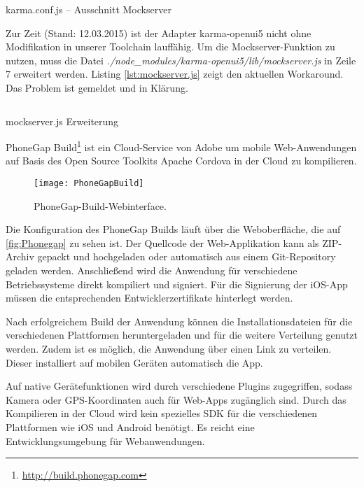 \begin{listing}[H]
	\inputminted[tabsize=2]{js}{src/karma.mockserver.conf.js}
	\caption{karma.conf.js -- Ausschnitt Mockserver}
	\label{lst:karma.mockserver.conf.js}
\end{listing}

Zur Zeit (Stand: 12.03.2015) ist der Adapter karma-openui5 nicht ohne Modifikation in unserer Toolchain lauffähig. Um die Mockserver-Funktion zu nutzen, muss die Datei \textit{./node\_modules/karma-openui5/lib/mockserver.js} in Zeile 7 erweitert werden. Listing \ref{lst:mockserver.js} zeigt den aktuellen Workaround. Das Problem ist gemeldet und in Klärung.

\begin{listing}[H]
	\inputminted[tabsize=2]{js}{src/mockserver.js}
	\caption{mockserver.js Erweiterung}
	\label{lst:mockserver.js}
\end{listing}

PhoneGap Build\footnote{\url{http://build.phonegap.com}} ist ein Cloud-Service von Adobe um mobile Web-An\-wen\-dun\-gen auf Basis des Open Source Toolkits Apache Cordova in der Cloud zu kompilieren. 

\begin{figure}[h]
\centering
\texttt{[image: PhoneGapBuild]}
\caption[PhoneGap-Build-Webinterface]{PhoneGap-Build-Webinterface.}
\label{fig:Phonegap}
\end{figure}

Die Konfiguration des PhoneGap Builds läuft über die Weboberfläche, die auf \autoref{fig:Phonegap} zu sehen ist. Der Quellcode der Web-Applikation kann als ZIP-Archiv gepackt und hochgeladen oder automatisch aus einem Git-Repository geladen werden. Anschließend wird die Anwendung für verschiedene Betriebssysteme direkt kompiliert und signiert. Für die Signierung der iOS-App müssen die  entsprechenden Entwicklerzertifikate hinterlegt werden.

Nach erfolgreichem Build der Anwendung können die Installationsdateien für die verschiedenen Plattformen heruntergeladen und für die weitere Verteilung genutzt werden. Zudem ist es möglich, die Anwendung über einen Link zu verteilen. Dieser installiert auf mobilen Geräten automatisch die App. 

Auf native Gerätefunktionen wird durch verschiedene Plugins zugegriffen, sodass Kamera oder GPS-Koordinaten auch für Web-Apps zugänglich sind. Durch das Kompilieren in der Cloud wird kein spezielles \ac{SDK} für die verschiedenen Plattformen wie iOS und Android benötigt. Es reicht eine Entwicklungsumgebung für Webanwendungen.

